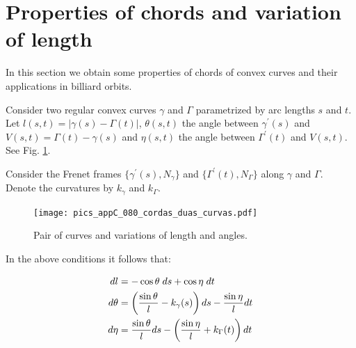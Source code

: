  \section[Properties of chords]{Properties of   chords and variation of length}
\label{sec:appC-cordas-causticas}
In this section we obtain some  properties of chords of convex curves and their applications in billiard orbits.
 
Consider two regular convex curves $\gamma$ and $\Gamma$ parametrized by arc lengths $s$ and $t$. 
Let $l(s,t)=|\gamma(s)-\Gamma(t)|$, $\theta(s,t) $ the angle between $\gamma^\prime(s)$ and $V(s,t)=\Gamma(t)-\gamma(s)$ and  $\eta(s,t) $ the angle between $\Gamma^\prime(t)$ and $V(s,t)$. See Fig. \ref{fig:appC-1corda}.

Consider the Frenet frames $\{\gamma^\prime (s), N_\gamma\}$ and $\{\Gamma^\prime (t), N_\Gamma\}$ along $\gamma$ and $\Gamma$.  Denote the curvatures by $k_\gamma$ and 
$k_\Gamma$.

\begin{figure}[H]
	\begin{center}
		 \texttt{[image:  pics\_appC\_080\_cordas\_duas\_curvas.pdf]}
		\caption {Pair of curves and variations of length and angles.\label{fig:appC-1corda}}
	\end{center}
\end{figure}

\begin{proposition}  In the above conditions it follows that:


	\begin{equation}
\aligned
dl&= -\cos\theta\;   ds + \cos\eta\;   dt\\
d\theta &=\left( \frac{\sin\theta }{l }-k_{ \gamma}(s)\right) ds -\frac{\sin\eta}{l } dt\\
d\eta &=  \frac{\sin\theta }{l } ds  - \left(  \frac{\sin\eta}{l } + k_{\Gamma }(t)\right)  dt
\endaligned
\label{eqn:appC-variacaoL}
\end{equation}
\label{prop:appC-variacaoL}
\end{proposition}

